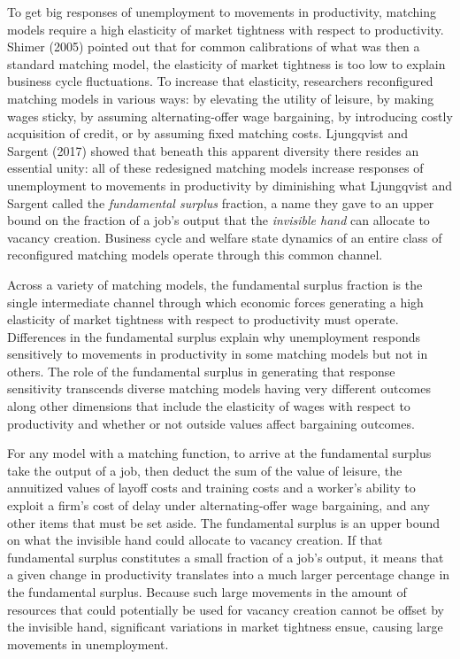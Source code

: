  To get big responses of unemployment to movements
in productivity, matching models require a high elasticity of market
tightness %
with respect to
productivity.  Shimer (2005) pointed out  that
for common calibrations of what was then a standard matching model, the elasticity
of market tightness is too low to explain business cycle fluctuations.
To increase that elasticity, researchers  reconfigured
matching models in various ways:  by elevating the utility
of leisure, by making wages sticky, by assuming alternating-offer wage
bargaining, by introducing costly acquisition of credit, or by
assuming fixed matching costs.  Ljungqvist and Sargent (2017) showed that beneath this apparent
diversity there resides an essential unity: all of these redesigned  matching models increase responses of
unemployment to movements in productivity by diminishing what Ljungqvist and Sargent called the
{\it fundamental surplus} fraction, a name they gave  to an upper bound
on the fraction of a job's output that the {\it invisible hand}
can allocate to vacancy creation. Business cycle and
welfare state dynamics of an entire class of reconfigured matching
models  operate through this common channel.


Across a variety of matching models, the fundamental surplus fraction is the
single intermediate channel through which economic forces
generating a high elasticity of market tightness with
respect to productivity must operate.  Differences in the  fundamental surplus
explain  why unemployment responds sensitively to
movements in productivity in some matching models but not in
others. The role of the fundamental surplus in generating that response sensitivity
transcends diverse matching models having
very different outcomes along other dimensions that include the elasticity of
wages with respect to productivity %
and
whether or not outside values affect bargaining outcomes.




For any model with a matching function,  to arrive at the fundamental surplus take the output of a job, then deduct the
sum of the value of leisure,
the annuitized values of layoff costs and training costs and a worker's
ability to exploit a firm's cost of delay under
alternating-offer wage bargaining, and  any other items that must
be set aside. The fundamental surplus is an
upper bound on what the invisible hand could allocate
to vacancy creation. If that fundamental surplus constitutes
a small fraction of a job's output, it means that a given change
in productivity translates into a  much larger percentage
change in the fundamental surplus. Because such large movements in the
amount of resources that could potentially be used for vacancy
creation cannot be offset by the invisible hand,
significant variations in market tightness ensue,  causing large
movements in unemployment.

